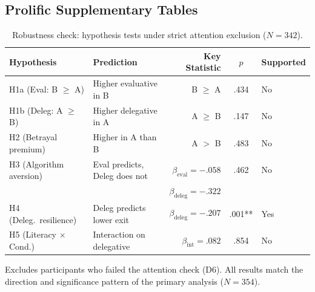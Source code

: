 \subsection{Prolific Supplementary Tables}


\begin{table}[H]
\centering
\begin{threeparttable}
\caption{Robustness check: hypothesis tests under strict attention exclusion ($N = 342$).}
\label{tab:supp_robust_attn}
\begin{small}
\begin{tabular}{llrcl}
\toprule
Hypothesis & Prediction & Key Statistic & $p$ & Supported \\
\midrule
H1a (Eval: B $\geq$ A) & Higher evaluative in B & B $\geq$ A & .434 & No \\
H1b (Deleg: A $\geq$ B) & Higher delegative in A & A $\geq$ B & .147 & No \\
H2 (Betrayal premium) & Higher in A than B & A $>$ B & .483 & No \\
H3 (Algorithm aversion) & Eval predicts, Deleg does not & $\beta_\text{eval} = -.058$ & .462 & No \\
                         &                               & $\beta_\text{deleg} = -.322$ & & \\
H4 (Deleg.\ resilience) & Deleg predicts lower exit & $\beta_\text{deleg} = -.207$ & .001** & Yes \\
H5 (Literacy $\times$ Cond.) & Interaction on delegative & $\beta_\text{int} = .082$ & .854 & No \\
\bottomrule
\end{tabular}
\end{small}
\begin{tablenotes}
\small
\item Excludes participants who failed the attention check (D6). All results match the direction and significance pattern of the primary analysis ($N = 354$).
\end{tablenotes}
\end{threeparttable}
\end{table}


